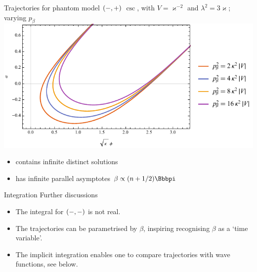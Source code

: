 \documentclass[9pt]{beamer}
\begin{document}
\begin{frame}%
{Trajectories for phantom model ${\left(-,+\right)}$}%
{$\csc$, with $V = \varkappa^{-2}$ and
$\lambda^2 = 3\varkappa$; varying $p_\beta$}
\includegraphics[width=\textwidth]{./plots.nb/csc_pbet_l.pdf}
\begin{itemize}
	\item contains infinite distinct solutions
	\item has infinite parallel asymptotes $\beta \propto \rbr{n+1/2}\pp $
\end{itemize}
\end{frame}

\begin{frame}%
{Integration}%
{Further discussions}
\begin{itemize}

\item The integral for ${\left(-,-\right)}$ is not real.

\item The trajectories can be parametrised by $\beta$, inspiring recognising
$\beta$ as a `time variable'.

\item The implicit integration enables one to compare trajectories with wave 
functions, see below.
\end{itemize}
\end{frame}
\end{document}

